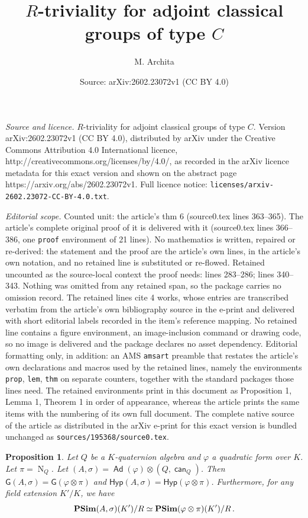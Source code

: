 \documentclass[10pt,a4paper]{amsart}
\title{$R$-triviality for adjoint classical groups of type $C$}
\author{M. Archita}
\date{Source: arXiv:2602.23072v1 (CC BY 4.0)}
\newtheorem{prop}{Proposition}
\newcommand\Ad{\operatorname{\mathsf{Ad}}}
\newcommand{\G}{\mathsf{G}}
\newcommand{\Hyp}{\mathsf{Hyp}}
\newcommand\N{\operatorname{N}}
\newcommand{\can}{\operatorname{\mathsf{can}}}
\newcommand{\s}{\sigma}
\newcommand{\vf}{\varphi}
\begin{document}
\maketitle

\noindent\emph{Source and licence.} $R$-triviality for adjoint classical groups of type $C$. Version arXiv:2602.23072v1 (CC BY 4.0), distributed by arXiv under the Creative Commons Attribution 4.0 International licence, http://creativecommons.org/licenses/by/4.0/, as recorded in the arXiv licence metadata for this exact version and shown on the abstract page https://arxiv.org/abs/2602.23072v1. Full licence notice: \texttt{licenses/arxiv-2602.23072-CC-BY-4.0.txt}.\par\smallskip

\noindent\textit{Editorial scope.} Counted unit: the article's thm 6 (source0.tex lines 363--365). The article's complete original proof of it is delivered with it (source0.tex lines 366--386, one \texttt{proof} environment of 21 lines). No mathematics is written, repaired or re-derived: the statement and the proof are the article's own lines, in the article's own notation, and no retained line is substituted or re-flowed.  Retained uncounted as the source-local context the proof needs: lines 283--286; lines 340--343.  Nothing was omitted from any retained span, so the package carries no omission record.  The retained lines cite 4 works, whose entries are transcribed verbatim from the article's own bibliography source in the e-print and delivered with short editorial labels recorded in the item's reference mapping.  No retained line contains a figure environment, an image-inclusion command or drawing code, so no image is delivered and the package declares no asset dependency.  Editorial formatting only, in addition: an AMS \texttt{amsart} preamble that restates the article's own declarations and macros used by the retained lines, namely the environments \texttt{prop}, \texttt{lem}, \texttt{thm} on separate counters, together with the standard packages those lines need.  The retained environments print in this document as Proposition 1, Lemma 1, Theorem 1 in order of appearance, whereas the article prints the same items with the numbering of its own full document.  The complete native source of the article as distributed in the arXiv e-print for this exact version is bundled unchanged as \texttt{sources/195368/source0.tex}.
\begin{prop}\label{initial}
Let $Q$ be a $K$-quaternion  algebra and $\vf$ a quadratic form over $K$. Let $\pi=\N_Q$.
Let  $(A,\s)= \Ad(\vf)\otimes (Q,\can_Q)$. Then $\G(A,\s)=\G(\vf\otimes \pi)$ and $\Hyp(A,\s)=\Hyp(\vf\otimes \pi)$. Furthermore, for any field extension $K'/K$, we have $${\bf PSim}(A,\s)(K')/R\simeq {\bf PSim}(\vf\otimes\pi)(K')/R\,.$$
\end{prop}
\end{document}
